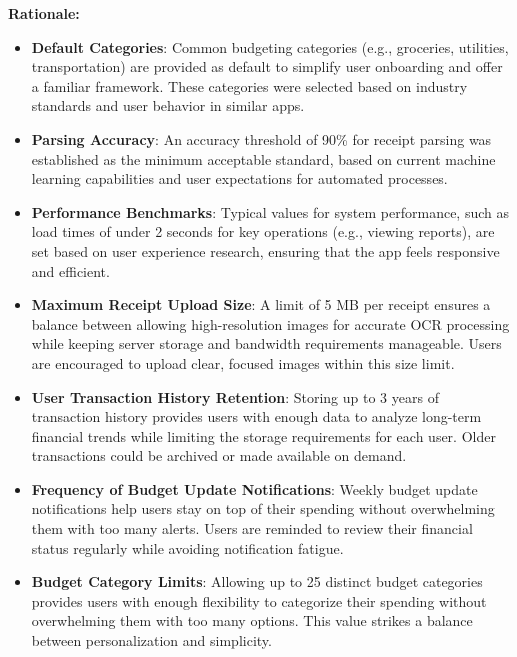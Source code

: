 \documentclass[12pt]{article}
\begin{document}
\noindent\textbf{Rationale:}
\begin{itemize}
    \item \textbf{Default Categories}: Common budgeting categories (e.g., groceries, utilities, transportation) are provided as default to simplify user onboarding and offer a familiar framework. These categories were selected based on industry standards and user behavior in similar apps.
    \item \textbf{Parsing Accuracy}: An accuracy threshold of 90\% for receipt parsing was established as the minimum acceptable standard, based on current machine learning capabilities and user expectations for automated processes.
    \item \textbf{Performance Benchmarks}: Typical values for system performance, such as load times of under 2 seconds for key operations (e.g., viewing reports), are set based on user experience research, ensuring that the app feels responsive and efficient.
    \item \textbf{Maximum Receipt Upload Size}: A limit of 5 MB per receipt ensures a balance between allowing high-resolution images for accurate OCR processing while keeping server storage and bandwidth requirements manageable. Users are encouraged to upload clear, focused images within this size limit.
    \item \textbf{User Transaction History Retention}: Storing up to 3 years of transaction history provides users with enough data to analyze long-term financial trends while limiting the storage requirements for each user. Older transactions could be archived or made available on demand.
    \item \textbf{Frequency of Budget Update Notifications}: Weekly budget update notifications help users stay on top of their spending without overwhelming them with too many alerts. Users are reminded to review their financial status regularly while avoiding notification fatigue.
    \item \textbf{Budget Category Limits}: Allowing up to 25 distinct budget categories provides users with enough flexibility to categorize their spending without overwhelming them with too many options. This value strikes a balance between personalization and simplicity.
\end{itemize}

\end{document}

